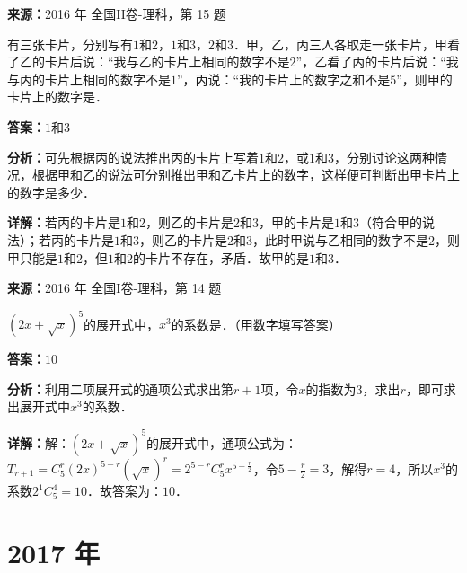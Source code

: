 \begin{question}[points=5]
\textbf{来源：}2016 年 全国II卷-理科，第 15 题\par
有三张卡片，分别写有$1$和$2$，$1$和$3$，$2$和$3$．甲，乙，丙三人各取走一张卡片，甲看了乙的卡片后说：“我与乙的卡片上相同的数字不是$2$”，乙看了丙的卡片后说：“我与丙的卡片上相同的数字不是$1$”，丙说：“我的卡片上的数字之和不是$5$”，则甲的卡片上的数字是．
\fillin[{$1$和$3$}]
\begin{solution}
\textbf{答案：}$1$和$3$

\textbf{分析：}可先根据丙的说法推出丙的卡片上写着$1$和$2$，或$1$和$3$，分别讨论这两种情况，根据甲和乙的说法可分别推出甲和乙卡片上的数字，这样便可判断出甲卡片上的数字是多少．

\textbf{详解：}若丙的卡片是$1$和$2$，则乙的卡片是$2$和$3$，甲的卡片是$1$和$3$（符合甲的说法）；若丙的卡片是$1$和$3$，则乙的卡片是$2$和$3$，此时甲说与乙相同的数字不是$2$，则甲只能是$1$和$2$，但$1$和$2$的卡片不存在，矛盾．故甲的是$1$和$3$．
\end{solution}
\end{question}

\begin{question}[points=5]
\textbf{来源：}2016 年 全国I卷-理科，第 14 题\par
$(2x+\sqrt{x})^5$的展开式中，$x^3$的系数是．（用数字填写答案）
\fillin[{$10$}]
\begin{solution}
\textbf{答案：}$10$

\textbf{分析：}利用二项展开式的通项公式求出第$r+1$项，令$x$的指数为$3$，求出$r$，即可求出展开式中$x^3$的系数．

\textbf{详解：}解：$(2x+\sqrt{x})^5$的展开式中，通项公式为：$T_{r+1}=C_5^r(2x)^{5-r}(\sqrt{x})^r=2^{5-r}C_5^r x^{5-\frac{r}{2}}$，令$5-\frac{r}{2}=3$，解得$r=4$，所以$x^3$的系数$2^{1}C_5^4=10$．故答案为：$10$．
\end{solution}
\end{question}

\section*{2017 年}

